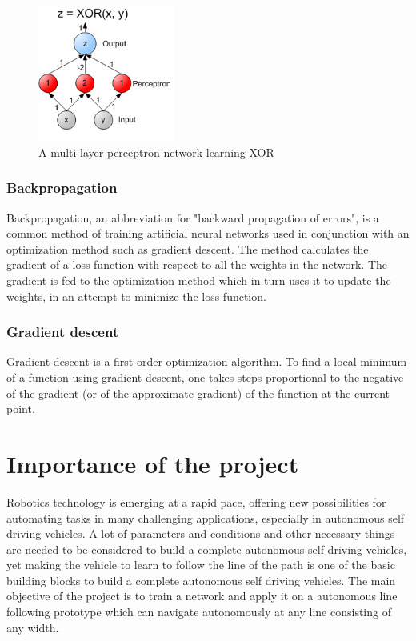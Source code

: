 \documentclass[14pt,a4paper]{extarticle}
\begin{document}
		\begin{figure}[H]
			\includegraphics[width=0.4\textwidth, center]{XOR_perceptron_net.png}
			\caption{A multi-layer perceptron network learning XOR}
		\end{figure}
		
		
	\subsubsection{Backpropagation}
	
	Backpropagation, an abbreviation for "backward propagation of errors", is a common method of training artificial neural networks used in conjunction with an optimization method such as gradient descent. The method calculates the gradient of a loss function with respect to all the weights in the network. The gradient is fed to the optimization method which in turn uses it to update the weights, in an attempt to minimize the loss function.
	
	
	
	\subsubsection{Gradient descent}
	Gradient descent is a first-order optimization algorithm. To find a local minimum of a function using gradient descent, one takes steps proportional to the negative of the gradient (or of the approximate gradient) of the function at the current point.
	
 
	\section{Importance of the project}
	
	Robotics technology is emerging at a rapid pace, offering new possibilities for automating tasks in many challenging applications, especially in autonomous self driving vehicles. A lot of parameters and conditions and other necessary things are needed to be considered to build a complete autonomous self driving vehicles, yet making the vehicle to learn to follow the line of the path is one of the basic building blocks to build a complete autonomous self driving vehicles. The main objective of the project is to train a network and apply it on a autonomous line following prototype which can navigate autonomously at any line consisting of any width. 
	
\end{document}
